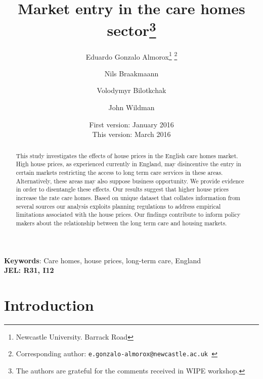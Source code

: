 \documentclass[12pt,letterpaper]{article}
\begin{document}
\title{\Huge{Market entry in the care homes sector\thanks{The authors are grateful for the comments received in WIPE workshop.}}}
\author{Eduardo Gonzalo Almorox\thanks{Newcastle University. Barrack Road} \thanks{Corresponding author: \tt{e.gonzalo-almorox@newcastle.ac.uk} } \and Nils Braakmaann\footnotemark[2]
 \and Volodymyr Bilotkchak\footnotemark[2] \and John Wildman\footnotemark[2]}


\date{First version: January 2016\\ This version: March 2016}
\maketitle

\begin{abstract}
This study investigates the effects of house prices in the English care homes market. 
High house prices, as experienced currently in England, may disincentive the entry in
 certain markets restricting the access to long term care services in these areas. Alternatively, 
 these areas may also suppose business opportunity. We provide evidence in order to disentangle 
 these effects. Our results suggest that higher house prices increase the rate care homes. 
 Based on unique dataset that collates information from several sources our analysis exploits 
 planning regulations to address empirical limitations associated with the house prices. Our findings
  contribute to inform policy makers about the relationship between the long term care and housing markets. 
\end{abstract}

{{\bf{Keywords}}: Care homes, house prices, long-term care, England\\
\bf{JEL}: R31, I12}

\newpage
\tableofcontents


\newpage
\section{Introduction}
\label{sec: intro}
\end{document}
